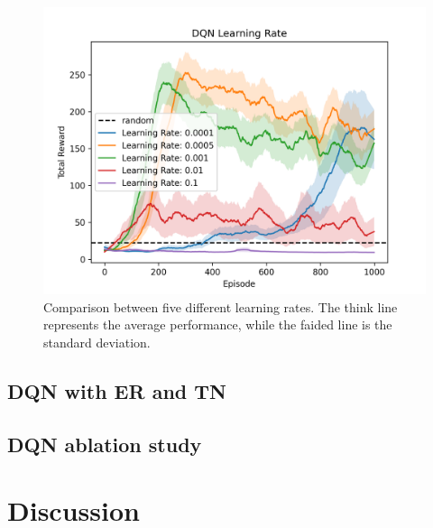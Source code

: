 \documentclass{article}
\begin{document}
   \begin{figure}[ht!]
      \centering
      \includegraphics[width=\columnwidth]{assets/fig_hp/learning_rate.png}
      \caption{Comparison between five different learning rates. The think line represents the average performance, while the faided line is the standard deviation. 
      }
      \label{comp_learning_rate}
   \end{figure}
 

\subsection{DQN with ER and TN}
\label{subsec:dqn-with-er-and-tn}


\subsection{DQN ablation study}
\label{subsec:dqn-ablation-study}


\section{Discussion}
\label{sec:discussion}
\end{document}
